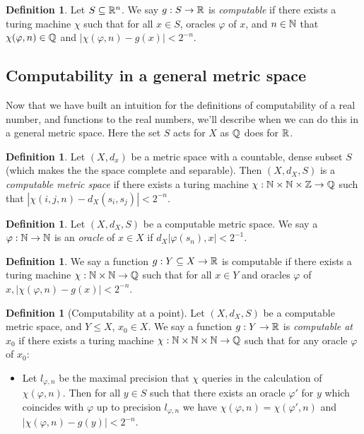 \documentclass[11pt, reqno]{amsart}
\theoremstyle{plain}
\numberwithin{thm}{subsection}
\theoremstyle{definition}
\newtheorem{defn}[thm]{Definition}
\begin{document}
\begin{defn}
    Let $S \subseteq \mathbb{R}^n$. We say $g: S \rightarrow \mathbb{R}$ is \textit{computable} if there exists a turing machine $\chi$ such that for all $x \in S$, oracles $\varphi$ of $x$, and $n \in \mathbb{N}$ that $\chi(\varphi, n) \in \mathbb{Q}$ and $|\chi(\varphi, n) - g(x)| < 2^{-n}$.
\end{defn}

\subsection{Computability in a general metric space}
Now that we have built an intuition for the definitions of computability of a real number, and functions to the real numbers, we'll describe when we can do this in a general metric space. Here the set $S$ acts for $X$ as $\mathbb{Q}$ does for $\mathbb{R}$. 

\begin{defn}
  Let $(X, d_x)$ be a metric space with a countable, dense subset $S$ (which makes the the space complete and separable). Then $(X, d_X, S)$ is a \textit{computable metric space} if there exists a turing machine $\chi: \mathbb{N}\times\mathbb{N} \times \mathbb{Z} \rightarrow \mathbb{Q}$ such that $|\chi(i,j,n) - d_X(s_i, s_j)| < 2^{-n}$.
\end{defn}

\begin{defn}
  Let $(X, d_X, S)$ be a computable metric space. We say a $\varphi: \mathbb{N} \rightarrow \mathbb{N}$ is an \textit{oracle} of $x \in X$ if $d_X|\varphi(s_n), x| < 2^{-1}$. 
\end{defn}

\begin{defn}
  We say a function $g: Y \subseteq X \rightarrow \mathbb{R}$ is computable if there exists a turing machine $\chi: \mathbb{N} \times \mathbb{N} \rightarrow \mathbb{Q}$ such that for all $x \in Y$ and oracles $\varphi$ of $x, |\chi(\varphi,n)-g(x)| < 2^{-n}$.
\end{defn}

\begin{defn}[Computability at a point]
   Let $(X, d_X, S)$ be a computable metric space, and $Y \leq X$, $x_0 \in X$. We say a function $g: Y \rightarrow \mathbb{R}$ is \textit{computable at $x_0$} if there exists a turing machine $\chi: \mathbb{N} \times \mathbb{N} \times \mathbb{N} \rightarrow \mathbb{Q}$ such that for any oracle $\varphi$ of $x_0$:
   \begin{itemize}
    \item[ ] Let $l_{\varphi, n}$ be the maximal precision that $\chi$ queries in the calculation of $\chi(\varphi, n)$. Then for all $y\in S$ such that there exists an oracle $\varphi'$ for $y$ which coincides with $\varphi$ up to precision $l_{\varphi, n}$ we have $\chi(\varphi, n) = \chi(\varphi', n)$ and $|\chi(\varphi, n) - g(y)| < 2^{-n}$.
   \end{itemize}
\end{defn}
\end{document}
